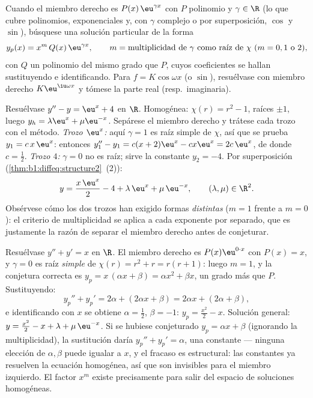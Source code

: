 \begin{method}[Solución particular para $f(x) = P(x)\,\eu^{\gamma x}$]\label{met:b1:diffeq:particular}
Cuando el miembro derecho es $P(x)\,\eu^{\gamma x}$ con $P$ polinomio y
$\gamma \in \R$ (lo que cubre polinomios, exponenciales y, con $\gamma$
complejo o por superposición, $\cos$ y $\sin$), búsquese una solución
particular de la forma
\[
y_p(x) = x^{m}\, Q(x)\, \eu^{\gamma x},
\qquad
m = \text{multiplicidad de } \gamma \text{ como raíz de } \chi
\ (m = 0, 1 \text{ o } 2),
\]
con $Q$ un polinomio del mismo grado que $P$, cuyos coeficientes se
hallan sustituyendo e identificando. Para $f = K\cos\omega x$ (o
$\sin$), resuélvase con miembro derecho $K\eu^{\iu\omega x}$ y tómese
la parte real (resp.\ imaginaria).
\end{method}

\begin{example}\label{ex:b1:diffeq:superposition}
Resuélvase $y'' - y = \eu^{x} + 4$ en $\R$. Homogénea:
$\chi(r) = r^2 - 1$, raíces $\pm1$, luego
$y_h = \lambda\eu^x + \mu\eu^{-x}$. Sepárese el miembro derecho y
trátese cada trozo con el método. \emph{Trozo $\eu^x$:} aquí
$\gamma = 1$ es raíz simple de $\chi$, así que se prueba
$y_1 = c\,x\,\eu^x$: entonces
$y_1'' - y_1 = c(x + 2)\eu^x - cx\eu^x = 2c\,\eu^x$, de donde
$c = \frac12$. \emph{Trozo $4$:} $\gamma = 0$ no es raíz; sirve la
constante $y_2 = -4$. Por superposición
(\cref{thm:b1:diffeq:structure2}~(2)):
\[
y = \frac{x\,\eu^x}2 - 4 + \lambda\,\eu^x + \mu\,\eu^{-x},
\qquad (\lambda, \mu) \in \R^2 .
\]
Obsérvese cómo los dos trozos han exigido formas \emph{distintas}
($m = 1$ frente a $m = 0$): el criterio de multiplicidad se aplica a
cada exponente por separado, que es justamente la razón de separar el
miembro derecho antes de conjeturar.
\end{example}

\begin{example}\label{ex:b1:diffeq:multiplicity}
Resuélvase $y'' + y' = x$ en $\R$. El miembro derecho es
$P(x)\eu^{0 \cdot x}$ con $P(x) = x$, y $\gamma = 0$ es raíz
\emph{simple} de $\chi(r) = r^2 + r = r(r + 1)$: luego $m = 1$, y la
conjetura correcta es $y_p = x\,(\alpha x + \beta) = \alpha x^2 +
\beta x$, un grado más que $P$. Sustituyendo:
\[
y_p'' + y_p' = 2\alpha + (2\alpha x + \beta)
= 2\alpha x + (2\alpha + \beta) ,
\]
e identificando con $x$ se obtiene $\alpha = \frac12$, $\beta = -1$:
$y_p = \frac{x^2}2 - x$. Solución general:
$y = \frac{x^2}2 - x + \lambda + \mu\,\eu^{-x}$. Si se hubiese
conjeturado $y_p = \alpha x + \beta$ (ignorando la multiplicidad), la
sustitución daría $y_p'' + y_p' = \alpha$, una constante --- ninguna
elección de $\alpha, \beta$ puede igualar a $x$, y el fracaso es
estructural: las constantes ya resuelven la ecuación homogénea, así que
son invisibles para el miembro izquierdo. El factor $x^m$ existe
precisamente para salir del espacio de soluciones homogéneas.
\end{example}

